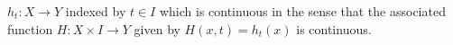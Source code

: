 \documentclass[preview]{standalone}
\begin{document}
\begin{center}
$h_t : X \to Y$ indexed by $t \in I$ which is continuous in the sense that the associated function $H : X \times I \to Y$ given by $H(x,t) = h_t(x)$ is continuous.
\end{center}
\end{document}
